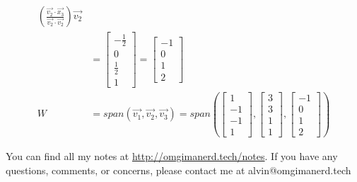 \documentclass{math}
\begin{document}
\begin{align*}
    \left(\frac{\vec{v_2}\cdot\vec{x_3}}
    {\vec{v_2}\cdot\vec{v_2}}\right)\vec{v_2} \\
  &= \begin{bmatrix}-\frac{1}{2} \\ 0 \\ \frac{1}{2} \\ 1\end{bmatrix} =
    \begin{bmatrix}-1 \\ 0 \\ 1 \\ 2\end{bmatrix} \\
  W &= span(\vec{v_1},\vec{v_2},\vec{v_3}) = span\left(
    \begin{bmatrix}1 \\ -1 \\ -1 \\ 1\end{bmatrix},
    \begin{bmatrix}3 \\ 3 \\ 1 \\ 1\end{bmatrix},
    \begin{bmatrix}-1 \\ 0 \\ 1 \\ 2\end{bmatrix}
  \right)
\end{align*}

\begin{center}
  You can find all my notes at \url{http://omgimanerd.tech/notes}. If you have
  any questions, comments, or concerns, please contact me at
  alvin@omgimanerd.tech
\end{center}
\end{document}
